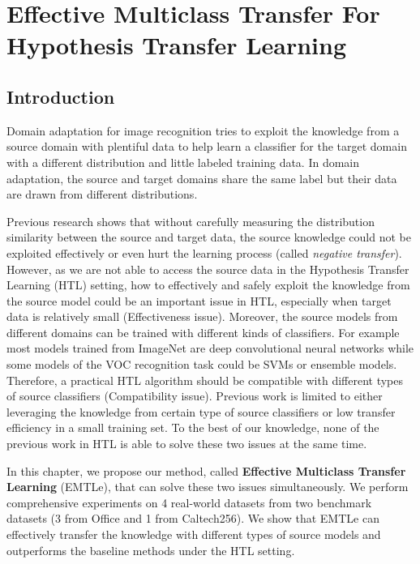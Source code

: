 \chapter{Effective Multiclass Transfer For Hypothesis Transfer Learning}\label{sec:pakdd}
\section{Introduction}
Domain adaptation for image recognition tries to exploit the knowledge from a source domain with plentiful data to help learn a classifier for the target domain with a different distribution and little labeled training data. In domain adaptation, the source and target domains share the same label but their data are drawn from different distributions.

Previous research \cite{ben2010theory,ben2007analysis} shows that without carefully measuring the distribution similarity between the source and target data, the source knowledge could not be exploited effectively or even hurt the learning process (called  \textit{negative transfer})\cite{pan2010survey}. 
However, as we are not able to access the source data in the Hypothesis Transfer Learning (HTL) \cite{kuzborskij2013stability} setting, how to effectively and safely exploit the knowledge from the source model could be an important issue in HTL, especially when target data is relatively small (Effectiveness issue). Moreover, the source models from different domains can be trained with different kinds of classifiers. For example most models trained from ImageNet are deep convolutional neural networks while some models of the VOC recognition task could be SVMs or ensemble models. Therefore, a practical HTL algorithm should be compatible with different types of source classifiers (Compatibility issue). Previous work is limited to either leveraging the knowledge from certain type of source classifiers \cite{tommasi2014learning,fei2006one} or low transfer efficiency in a small training set\cite{jie2011multiclass}. To the best of our knowledge, none of the previous work in HTL is able to solve these two issues at the same time.

In this chapter, we propose our method, called \textbf{Effective Multiclass Transfer Learning} (EMTLe), that can solve these two issues simultaneously. We perform comprehensive experiments on 4 real-world datasets from two benchmark datasets (3 from Office and 1 from Caltech256). We show that EMTLe can effectively transfer the knowledge with different types of source models and outperforms the baseline methods under the HTL setting.

